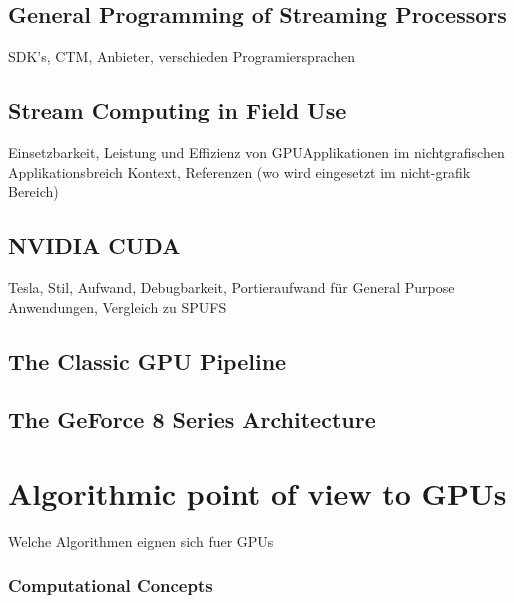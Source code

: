 \subsection{General Programming of Streaming Processors} %
\label{sub:programming_streaming_processors}
SDK's, CTM, Anbieter, verschieden Programiersprachen

\subsection{Stream Computing in Field Use} %
\label{sub:stream_computing_in_use}
Einsetzbarkeit, Leistung und Effizienz von \gls{GPU}Applikationen im nichtgrafischen Applikationsbreich Kontext, Referenzen (wo wird eingesetzt im nicht-grafik
Bereich)

\subsection{NVIDIA CUDA} %
\label{sub:nvidia_cuda}
Tesla, Stil, Aufwand, Debugbarkeit, Portieraufwand für 
General Purpose Anwendungen, Vergleich zu SPUFS

\subsection{The Classic GPU Pipeline} %
\label{sub:the_classic_gpu_pipeline}

\subsection{The GeForce 8 Series Architecture} %
\label{sub:the_geforce_8_series_architecture}


\section{Algorithmic point of view to GPUs} %
\label{sec:algorithmic_view_to_gpus}
Welche Algorithmen eignen sich fuer GPUs
\subsubsection{Computational Concepts} %
\label{ssub:computational_concepts}

